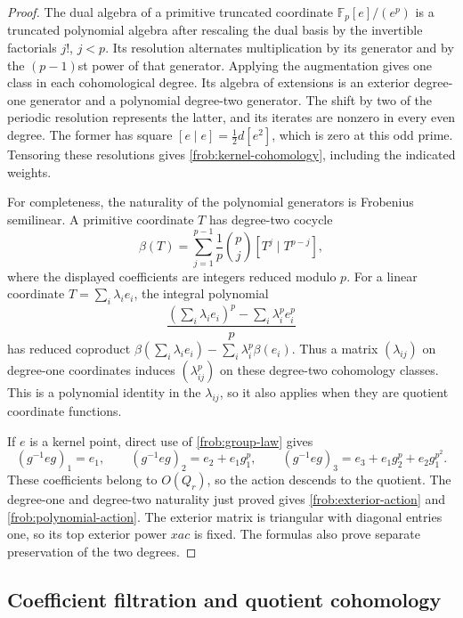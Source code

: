 \begin{proof}
The dual algebra of a primitive truncated coordinate
$\mathbb F_p[e]/(e^p)$ is a truncated polynomial algebra after rescaling
the dual basis by the invertible factorials $j!$, $j<p$.
Its resolution alternates multiplication by its generator and by the
$(p-1)$st power of that generator.  Applying the augmentation gives
one class in each cohomological degree.  Its algebra of extensions is
an exterior degree-one generator and a polynomial degree-two
generator.  The shift by two of the periodic resolution represents
the latter, and its iterates are nonzero in every even degree.
The former has square $[e\mid e]=\tfrac12d[e^2]$, which is zero
at this odd prime.
Tensoring these resolutions gives \eqref{frob:kernel-cohomology},
including the indicated weights.

For completeness, the naturality of the polynomial generators is
Frobenius semilinear.  A primitive coordinate $T$ has degree-two cocycle
\[
 \beta(T)=\sum_{j=1}^{p-1}\frac{1}{p}\binom pj
                      [T^j\mid T^{p-j}],
\]
where the displayed coefficients are integers reduced modulo $p$.
For a linear coordinate $T=\sum_i\lambda_i e_i$, the integral
polynomial
\[
 \frac{(\sum_i\lambda_i e_i)^p-\sum_i\lambda_i^p e_i^p}{p}
\]
has reduced coproduct
$\beta(\sum_i\lambda_i e_i)-\sum_i\lambda_i^p\beta(e_i)$.
Thus a matrix $(\lambda_{ij})$ on degree-one coordinates induces
$(\lambda_{ij}^p)$ on these degree-two cohomology classes.  This is a
polynomial identity in the $\lambda_{ij}$, so it also applies when
they are quotient coordinate functions.

If $e$ is a kernel point, direct use of \eqref{frob:group-law} gives
\[
 (g^{-1}eg)_1=e_1,\qquad
 (g^{-1}eg)_2=e_2+e_1g_1^p,\qquad
 (g^{-1}eg)_3=e_3+e_1g_2^p+e_2g_1^{p^2}.
\]
These coefficients belong to $O(Q_r)$, so the action descends to
the quotient.  The degree-one and degree-two naturality just proved
gives \eqref{frob:exterior-action} and
\eqref{frob:polynomial-action}.  The exterior matrix is triangular
with diagonal entries one, so its top exterior power $xac$ is fixed.
The formulas also prove separate preservation of the two degrees.
\end{proof}

\subsection{Coefficient filtration and quotient cohomology}

